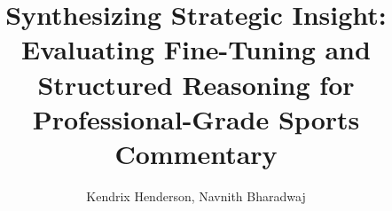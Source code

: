\documentclass[runningheads]{llncs}
\begin{document}
\pagestyle{headings}
\mainmatter
\def\ECCV16SubNumber{***}  %

\title{Synthesizing Strategic Insight: Evaluating Fine-Tuning and Structured Reasoning for Professional-Grade Sports Commentary} %


\author{Kendrix Henderson, Navnith Bharadwaj}

\maketitle 

% 

\newpage

\newpage

\newpage

% 

\newpage

\end{document}
